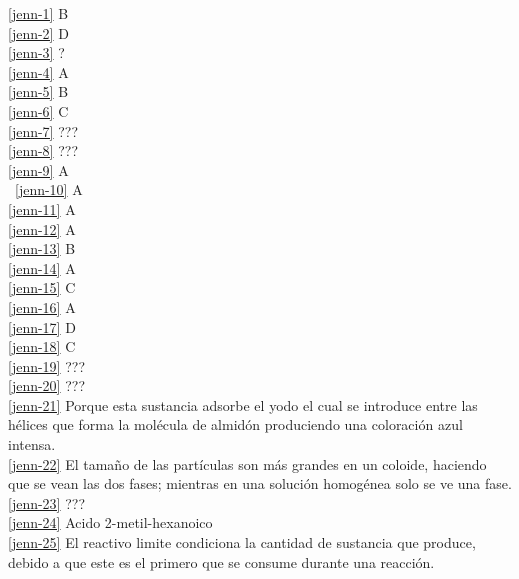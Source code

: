 

\noindent \ref{jenn-1} B\\
\ref{jenn-2} D\\
\ref{jenn-3} ?\\
\ref{jenn-4} A\\
\ref{jenn-5} B\\
\ref{jenn-6} C\\
\ref{jenn-7} ???\\
\ref{jenn-8} ???\\
\ref{jenn-9} A\\\
\ref{jenn-10} A\\
\ref{jenn-11} A\\
\ref{jenn-12} A\\
\ref{jenn-13} B\\
\ref{jenn-14} A\\
\ref{jenn-15} C\\
\ref{jenn-16} A\\
\ref{jenn-17} D\\
\ref{jenn-18} C\\
\ref{jenn-19} ???\\
\ref{jenn-20} ???\\
\ref{jenn-21} Porque esta sustancia adsorbe el yodo el cual se introduce entre las hélices que forma  la molécula de almidón produciendo una coloración azul intensa.\\
\ref{jenn-22} El tamaño de las partículas son más grandes en un coloide, haciendo que se vean las dos fases; mientras en una solución homogénea solo se ve una fase.\\
\ref{jenn-23} ???\\
\ref{jenn-24} Acido 2-metil-hexanoico\\
\ref{jenn-25} El reactivo limite condiciona la cantidad de sustancia que produce, debido a que este es el primero que se consume durante una reacción.\\


